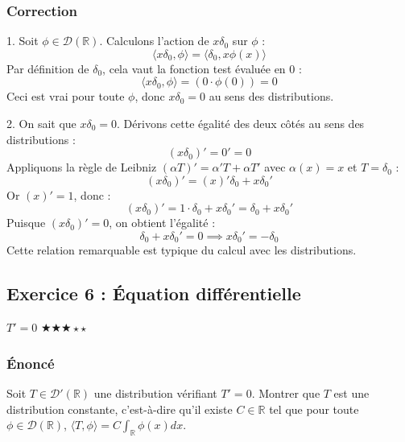 \documentclass[11pt,a4paper]{article}
\begin{document}
\subsubsection*{Correction}
1. Soit $\phi \in \mathcal{D}(\mathbb{R})$.
Calculons l'action de $x \delta_0$ sur $\phi$ :
$$ \langle x \delta_0, \phi \rangle = \langle \delta_0, x \phi(x) \rangle $$
Par définition de $\delta_0$, cela vaut la fonction test évaluée en $0$ :
$$ \langle x \delta_0, \phi \rangle = (0 \cdot \phi(0)) = 0 $$
Ceci est vrai pour toute $\phi$, donc $x \delta_0 = 0$ au sens des distributions.

2. On sait que $x \delta_0 = 0$.
Dérivons cette égalité des deux côtés au sens des distributions :
$$ (x \delta_0)' = 0' = 0 $$
Appliquons la règle de Leibniz $(\alpha T)' = \alpha' T + \alpha T'$ avec $\alpha(x) = x$ et $T = \delta_0$ :
$$ (x \delta_0)' = (x)' \delta_0 + x \delta_0' $$
Or $(x)' = 1$, donc :
$$ (x \delta_0)' = 1 \cdot \delta_0 + x \delta_0' = \delta_0 + x \delta_0' $$
Puisque $(x \delta_0)' = 0$, on obtient l'égalité :
$$ \delta_0 + x \delta_0' = 0 \implies x \delta_0' = - \delta_0 $$
Cette relation remarquable est typique du calcul avec les distributions.


\subsection*{Exercice 6 : Équation différentielle}$T' = 0$  \quad $\bigstar\bigstar\bigstar\star\star$


\subsubsection*{Énoncé}
Soit $T \in \mathcal{D}'(\mathbb{R})$ une distribution vérifiant $T' = 0$.
Montrer que $T$ est une distribution constante, c'est-à-dire qu'il existe $C \in \mathbb{R}$ tel que pour toute $\phi \in \mathcal{D}(\mathbb{R})$, $\langle T, \phi \rangle = C \int_{\mathbb{R}} \phi(x) dx$.
\end{document}

